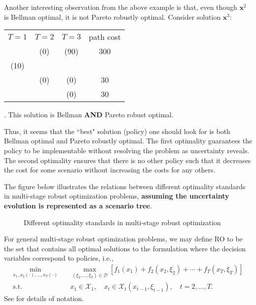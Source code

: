 \documentclass[10pt]{article}
\theoremstyle{plain}
\theoremstyle{definition}
\theoremstyle{remark}
\newcommand{\mcal}{\mathcal}
\newcommand{\subjectto}{\text{s.t.}}
\newcommand{\bx}{\mathbf{x}}
\begin{document}
Another interesting observation from the above example is that,
even though $\bx^2$ is Bellman optimal, it is not Pareto robustly optimal.
Consider solution $\bx^3$:
\begin{tabular}{ccc c}
	$T=1$ & $T=2$ & $T=3$ & path cost\\
	& (0) & (90) & 300\\
(10) & & & \\
	& (0) & (0) & 30 \\
	& 	& (0) & 30
\end{tabular}.
This solution is Bellman {\bf AND} Pareto robust optimal.

{\color{blue} Thus, it seems that the ``best" solution (policy) one should look for is both Bellman optimal and Pareto robustly optimal.
The first optimality guarantees the policy to be implementable without resolving the problem as uncertainty reveals.
The second optimality ensures that there is no other policy such that it decreases the cost for some scenario without increasing the costs for any others.}

The figure below illustrates the relations between different optimality
standards in multi-stage robust optimization problems, {\bf assuming the uncertainty evolution is represented as a scenario tree}.
\begin{figure}[htb!]
\begin{center}
\caption{Different optimality standards in multi-stage robust optimization}
\label{fig:optimality-relation}
\end{center}
\end{figure}

For general multi-stage robust optimization problems, {\color{red}we may define} RO to be the set that contains
all optimal solutions to the formulation where the decision variables correspond to policies, i.e.,
\begin{subequations}\label{formulation:policy}
\begin{align}
\min_{x_1, x_2(\cdot), \ldots, x_T(\cdot)}\quad & \max_{(\xi_2,\ldots,\xi_T)\in \mcal{D}} [f_1(x_1)+f_2(x_2,\xi_2)+ \cdots + f_{T}(x_T,\xi_T)]\\
\subjectto \qquad\quad & x_1\in \mcal{X}_1,\quad x_t\in \mcal{X}_t(x_{t-1},\xi_{t-1}), \quad t=2,\ldots, T.
\end{align}
\end{subequations}
See \citet{shapiro2011dynamic} for details of notation.
\end{document}
